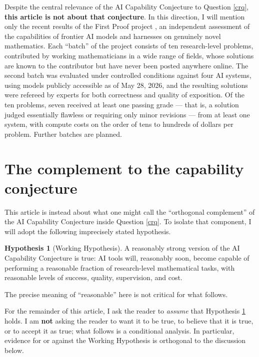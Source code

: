 \documentclass[12pt]{amsart}
\theoremstyle{definition}
\newtheorem{hypothesis}{Hypothesis}[section]
\begin{document}
Despite the central relevance of the AI Capability Conjecture to Question \ref{crq}, \textbf{this article is not about that conjecture}.  In this direction, I will mention only the recent results of the First Proof project \cite{firstproof-web}, an independent assessment of the capabilities of frontier AI models and harnesses on genuinely novel mathematics.  Each ``batch'' of the project consists of ten research-level problems, contributed by working mathematicians in a wide range of fields, whose solutions are known to the contributor but have never been posted anywhere online.  The second batch \cite{firstproof} was evaluated under controlled conditions against four AI systems, using models publicly accessible as of May 28, 2026, and the resulting solutions were refereed by experts for both correctness and quality of exposition.  Of the ten problems, seven received at least one passing grade --- that is, a solution judged essentially flawless or requiring only minor revisions --- from at least one system, with compute costs on the order of tens to hundreds of dollars per problem.  Further batches are planned.  

\section{The complement to the capability conjecture}

This article is instead about what one might call the ``orthogonal complement'' of the AI Capability Conjecture inside Question \ref{crq}.  To isolate that component, I will adopt the following imprecisely stated hypothesis.

\begin{hypothesis}[Working Hypothesis]\label{wh} A reasonably strong version of the AI Capability Conjecture is true: AI tools will, reasonably soon, become capable of performing a reasonable fraction of research-level mathematical tasks, with reasonable levels of success, quality, supervision, and cost.
\end{hypothesis}

The precise meaning of ``reasonable'' here is not critical for what follows.

For the remainder of this article, I ask the reader to \emph{assume} that Hypothesis \ref{wh} holds.  I am \textbf{not} asking the reader to want it to be true, to believe that it is true, or to accept it as true; what follows is a conditional analysis.  In particular, evidence for or against the Working Hypothesis is orthogonal to the discussion below.
\end{document}
